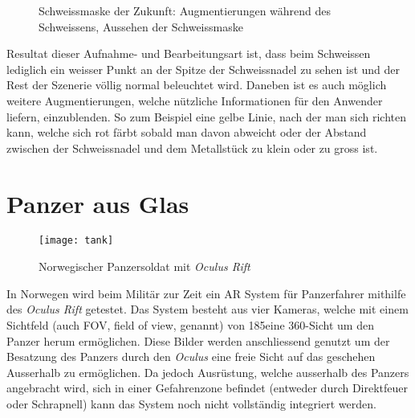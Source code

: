 \vspace{-30pt}
\begin{figure}[h]%
	\centering
	\hspace{8pt}%
	\caption[Schweissmaske der Zukunft]
	{Schweissmaske der Zukunft:
	 Augmentierungen während des Schweissens,
	 Aussehen der Schweissmaske}%
	\label{fig:weld}%
\end{figure}
\vspace{-15pt}
Resultat dieser Aufnahme- und Bearbeitungsart ist, dass beim Schweissen lediglich ein weisser Punkt an der Spitze der Schweissnadel zu sehen ist und der Rest der Szenerie völlig normal beleuchtet wird. Daneben ist es auch möglich weitere Augmentierungen, welche nützliche Informationen für den Anwender liefern, einzublenden. So zum Beispiel eine gelbe Linie, nach der man sich richten kann, welche sich rot färbt sobald man davon abweicht oder der Abstand zwischen der Schweissnadel und dem Metallstück zu klein oder zu gross ist.\cite{website:welding}

\newpage
\section{Panzer aus Glas}\label{s.tank}
\begin{wrapfigure}{r}{0.5\textwidth}
	\vspace{-25pt}
	\begin{center}
		\texttt{[image: tank]}
	\end{center}
	\vspace{-15pt}
	\captionsetup{width=0.42\textwidth}
	\caption{Norwegischer Panzersoldat mit \textit{Oculus Rift}}\label{tank}
	\vspace{-10pt}
\end{wrapfigure}
In Norwegen wird beim Militär zur Zeit ein AR System für Panzerfahrer mithilfe des \textit{Oculus Rift} getestet. Das System besteht aus vier Kameras, welche mit einem Sichtfeld (auch FOV, field of view, genannt) von 185\textdegree eine 360\textdegree-Sicht um den Panzer herum ermöglichen. Diese Bilder werden anschliessend genutzt um der Besatzung des Panzers durch den \textit{Oculus} eine freie Sicht auf das geschehen Ausserhalb zu ermöglichen. Da jedoch Ausrüstung, welche ausserhalb des Panzers angebracht wird, sich in einer Gefahrenzone befindet (entweder durch Direktfeuer oder Schrapnell) kann das System noch nicht vollständig integriert werden.\cite{website:tank}
\vspace{-12pt}
